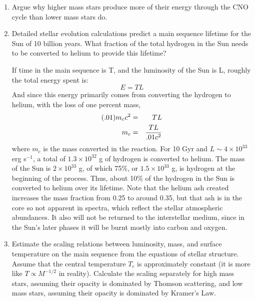 \begin{enumerate} 
\item Argue why higher mass stars produce more of their energy through
    the CNO cycle than lower mass stars do.
\item Detailed stellar evolution calculations predict a main sequence
    lifetime for the Sun of 10 billion years. What fraction of the
    total hydrogen in the Sun needs to be converted to helium to
    provide this lifetime?

\begin{answer}
If time in the main sequence is T, and the luminosity of the Sun is L,
roughly the total energy spent is:
\begin{equation}
E =  T L
\end{equation}
And since this energy primarily comes from converting the hydrogen to
helium, with the loss of one percent mass,
\begin{eqnarray}
(.01) m_c c^{2} & =&  T L \cr
m_c & =&  \frac{T L}{.01 c^2}
\end{eqnarray}
where $m_c$ is the mass converted in the reaction. For 10 Gyr and
$L\sim 4 \times 10^{33}$ erg s$^{-1}$, a total of $1.3\times 10^{32}$
g of hydrogen is converted to helium. The mass of the Sun is $2\times
10^{33}$ g, of which 75\%, or $1.5\times 10^{33}$ g, is hydrogen at
the beginning of the process. Thus, about 10\% of the hydrogen in the
Sun is converted to helium over its lifetime. Note that the helium ash
created increases the mass fraction from 0.25 to around 0.35, but that
ash is in the core so not apparent in spectra, which reflect the
stellar atmospheric abundances. It also will not be returned to the
interstellar medium, since in the Sun's later phases it will be
burnt mostly into carbon and oxygen.
\end{answer}

\item Estimate the scaling relations between luminosity, mass, and
    surface temperature on the main sequence from the equations of
    stellar structure. Assume that the central temperature $T_c$ is
    approximately constant (it is more like $T\propto M^{-1/2}$ in
    reality). Calculate the scaling separately for high mass stars,
    assuming their opacity is dominated by Thomson scattering, and low
    mass stars, assuming their opacity is dominated by Kramer's Law.


\end{enumerate}
